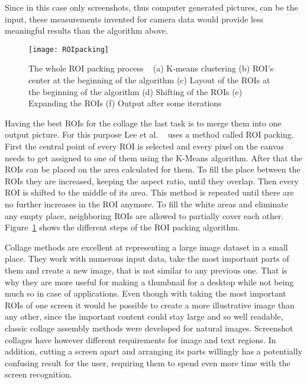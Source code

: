 \documentclass[draft,final]{vutinfth} %
\begin{document}
	Since in this case only screenshots, thus computer generated pictures, can be the input, these measurements invented for camera data would provide less meaningful results than the algorithm above.\par 
	\begin{figure}[h]
		\centering		
		\texttt{[image: ROIpacking]}
		\caption{The whole ROI packing process ~\cite{lee2010mobile} (a) K-means clustering (b) ROI's center at the beginning of the algorithm (c) Layout of the ROIs at the beginning of the algorithm (d) Shifting of the ROIs (e) Expanding the ROIs (f) Output after some iterations}
		\label{fig:ROIpacking}
	\end{figure}
	Having the best ROIs for the collage the last task is to merge them into one output picture.
	For this purpose Lee et al. ~\cite{lee2010mobile} uses a method called ROI packing.
	First the central point of every ROI is selected and every pixel on the canvas needs to get assigned to one of them using the K-Means algorithm.
	After that the ROIs can be placed on the area calculated for them.
	To fill the place between the ROIs they are increased, keeping the aspect ratio, until they overlap. 
	Then every ROI is shifted to the middle of its area.
	This method is repeated until there are no further increases in the ROI anymore.
	To fill the white areas and eliminate any empty place, neighboring ROIs are allowed to partially cover each other.
	Figure~\ref{fig:ROIpacking} shows the different steps of the ROI packing algorithm.\par 
	Collage methods are excellent at representing a large image dataset in a small place.
	They work with numerous input data, take the most important parts of them and create a new image, that is not similar to any previous one.
	That is why they are more useful for making a thumbnail for a desktop while not being much so in case of applications.
	Even though with taking the most important ROIs of one screen it would be possible to create a  more illustrative image than any other, since the important content could stay large and so well readable, classic collage assembly methods were developed for natural images.
	Screenshot collages have however different requirements for image and text regions.
	In addition, cutting a screen apart and arranging its parts willingly has a potentially confusing result for the user, requiring them to spend even more time with the screen recognition.
	
\end{document}
